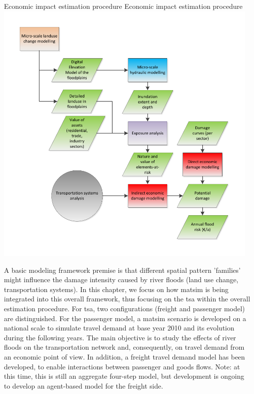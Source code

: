 \createfigure%
{Economic impact estimation procedure}%
{Economic impact estimation procedure}%
{\label{fig:belgium_fig1}}%
{\includegraphics[width=0.97\textwidth, angle=0]{scenarios/figures/belgium_fig1.pdf}}%
{}

A basic modeling framework premise is that different spatial pattern 'families' might influence the damage intensity caused by river floods (\eg land use change, transportation systems). 
In this chapter, we focus on how \gls{matsim} is being integrated into this overall framework, thus focusing on the \gls{tsa} within the overall estimation procedure.  For \gls{tsa}, two configurations (freight and passenger model) are distinguished. 
For the passenger model, a \gls{matsim} scenario is developed on a national scale to simulate travel demand at base year 2010 and its evolution during the following years. 
The main objective is to study the effects of river floods on the transportation network and, consequently, on travel demand from an economic point of view. 
In addition, a freight travel demand model has been developed, to enable interactions between passenger and goods flows. 
Note: at this time, this is still an aggregate four-step model, but development is ongoing to develop an agent-based model for the freight side.  

